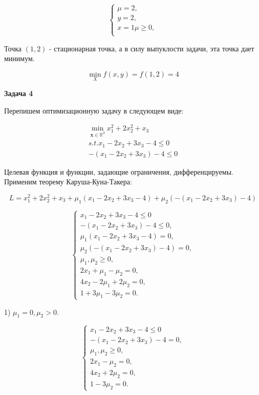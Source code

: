 \documentclass[12pt]{article}
\begin{document}
\begin{equation}
\begin{cases}
\mu = 2, \\
y = 2,\\
x = 1
\mu \geq 0,\\
\end{cases}
\end{equation}

Точка $(1,2)$ - стационарная точка, а в силу выпуклости задачи, эта точка дает минимум.

$$\boxed{\min\limits_X f(x,y) = f(1, 2)= 4}$$

\begin{center}
	\textbf{Задача 4}
\end{center}

Перепишем оптимизационную задачу в следующем виде:

\begin{gather}
\min\limits_{\textbf{x}\in\mathbb{R}^3}x_1^2+2x_2^2 +x_3\\
s.t. x_1 - 2x_2+3x_3 -4\leq 0\\
-(x_1 - 2x_2+3x_3) -4\leq 0
\end{gather}

Целевая функция и функции, задающие ограничения, дифференцируемы. Применим теорему Каруша-Куна-Такера:

$$L = x_1^2+2x_2^2 +x_3 + \mu_1(x_1 - 2x_2+3x_3 -4) + \mu_2(-(x_1 - 2x_2+3x_3) -4)$$

\begin{equation}
\begin{cases}
x_1 - 2x_2+3x_3 -4\leq 0\\
-(x_1 - 2x_2+3x_3) -4\leq 0,\\
 \mu_1(x_1 - 2x_2+3x_3 -4) = 0,\\
\mu_2(-(x_1 - 2x_2+3x_3) -4) = 0,\\
\mu_1,\mu_2\geq 0,\\
2x_1 + \mu_1-\mu_2=0,\\
4x_2- 2\mu_1+2\mu_2=0,\\
1 + 3\mu_1 - 3\mu_2 = 0.
\end{cases}
\end{equation}

1) $\mu_1 = 0, \mu_2 > 0$.

\begin{equation}
\begin{cases}
x_1 - 2x_2+3x_3 -4\leq 0\\
-(x_1 - 2x_2+3x_3) -4= 0,\\
\mu_1,\mu_2\geq 0,\\
2x_1-\mu_2=0,\\
4x_2+2\mu_2=0,\\
1 - 3\mu_2 = 0.
\end{cases}
\end{equation}
\end{document}
